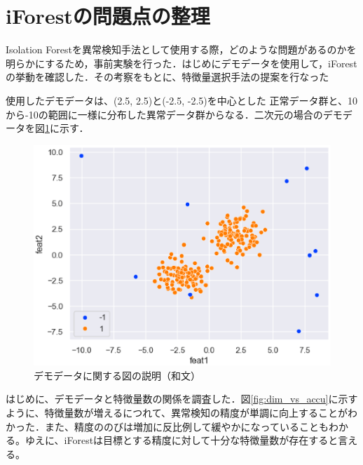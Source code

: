 \documentclass{css}
\begin{document}
\section{iForestの問題点の整理}
Isolation Forestを異常検知手法として使用する際，どのような問題があるのかを明らかにするため，事前実験を行った．はじめにデモデータを使用して，iForestの挙動を確認した．その考察をもとに、特徴量選択手法の提案を行なった

使用したデモデータは、(2.5, 2.5)と(-2.5, -2.5)を中心とした
正常データ群と、10から-10の範囲に一様に分布した異常データ群からなる．二次元の場合のデモデータを図\ref{fig:demodata}に示す．

\begin{figure}[tb]
    \centering
    \includegraphics[width=\linewidth]{pictures/eps/demodata.eps}
    \caption{デモデータに関する図の説明（和文）}
    \label{fig:demodata}
\end{figure}

はじめに、デモデータと特徴量数の関係を調査した．図\ref{fig:dim_vs_accu}に示すように、特徴量数が増えるにつれて、異常検知の精度が単調に向上することがわかった．また、精度ののびは増加に反比例して緩やかになっていることもわかる。ゆえに、iForestは目標とする精度に対して十分な特徴量数が存在すると言える。
\end{document}
